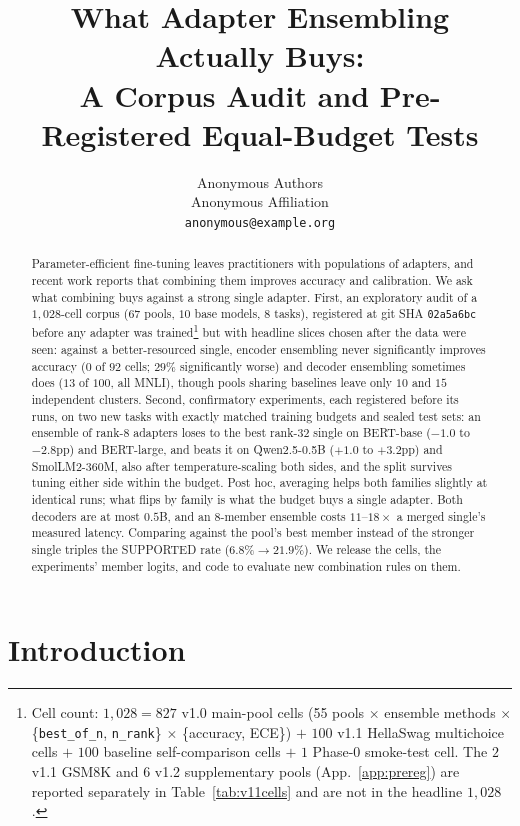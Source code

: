 \documentclass[11pt]{article}
\title{What Adapter Ensembling Actually Buys:\\A Corpus Audit and Pre-Registered Equal-Budget Tests}
\author{
  Anonymous Authors \\
  Anonymous Affiliation \\
  \texttt{anonymous@example.\allowbreak org}
}
\date{}
\begin{document}
\maketitle

\begin{abstract}
Parameter-efficient fine-tuning leaves practitioners with populations of adapters, and recent work reports that combining them improves accuracy and calibration. We ask what combining buys against a strong single adapter. First, an exploratory audit of a $1{,}028$-cell corpus ($67$ pools, $10$ base models, $8$ tasks), registered at git SHA \texttt{02a5a6bc} before any adapter was trained\footnote{Cell count: $1{,}028 = 827$ v1.0 main-pool cells (55 pools $\times$ ensemble methods $\times$ \{\texttt{best\_of\_n}, \texttt{n\_rank}\} $\times$ \{accuracy, ECE\}) $+$ $100$ v1.1 HellaSwag multichoice cells $+$ $100$ baseline self-comparison cells $+$ $1$ Phase-0 smoke-test cell. The $2$ v1.1 GSM8K and $6$ v1.2 supplementary pools (App.~\ref{app:prereg}) are reported separately in Table~\ref{tab:v11cells} and are not in the headline $1{,}028$.} but with headline slices chosen after the data were seen: against a better-resourced single, encoder ensembling never significantly improves accuracy ($0$ of $92$ cells; $29\%$ significantly worse) and decoder ensembling sometimes does ($13$ of $100$, all MNLI), though pools sharing baselines leave only $10$ and $15$ independent clusters. Second, confirmatory experiments, each registered before its runs, on two new tasks with exactly matched training budgets and sealed test sets: an ensemble of rank-$8$ adapters loses to the best rank-$32$ single on BERT-base ($-1.0$ to $-2.8$pp) and BERT-large, and beats it on Qwen2.5-0.5B ($+1.0$ to $+3.2$pp) and SmolLM2-360M, also after temperature-scaling both sides, and the split survives tuning either side within the budget. Post hoc, averaging helps both families slightly at identical runs; what flips by family is what the budget buys a single adapter. Both decoders are at most $0.5$B, and an $8$-member ensemble costs $11$--$18\times$ a merged single's measured latency. Comparing against the pool's best member instead of the stronger single triples the SUPPORTED rate ($6.8\%\to21.9\%$). We release the cells, the experiments' member logits, and code to evaluate new combination rules on them.
\end{abstract}

\section{Introduction}
\end{document}
